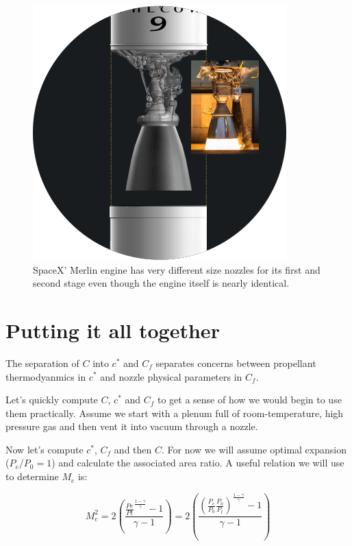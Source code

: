 \documentclass[twocolumn]{memoir} %
\begin{document}
\begin{figure}[H]
    \includegraphics[width=0.9\columnwidth]{merlin}
    \caption{SpaceX' Merlin engine has very different size nozzles for its first
    and second stage even though the engine itself is nearly identical.}
\end{figure}

\section{Putting it all together}\label{putting-it-all-together}

The separation of \(C\) into \(c^*\) and \(C_f\) separates
concerns between propellant thermodyanmics in \(c^*\) and nozzle
physical parameters in \(C_f\).

Let's quickly compute \(C\), \(c^*\) and \(C_f\) to get a sense of
how we would begin to use them practically. Assume we start with a
plenum full of room-temperature, high pressure gas and then vent it
into vacuum through a nozzle. 

Now let's compute \(c^*\), \(C_f\) and then \(C\). For now we will
assume optimal expansion ($P_e/P_0 = 1$) and calculate the associated area ratio. A
useful relation we will use to determine \(M_e\) is:

\begin{equation}
    M_e^2 = 2\left(\frac{\frac{Pe}{Pt}^{\frac{1-\gamma}{\gamma}}-1}{\gamma-1}\right) = 2\left(\frac{\left(\frac{P_e}{P_0}\frac{P_0}{P_t}\right)^{\frac{1-\gamma}{\gamma}}-1}{\gamma-1}\right)
\end{equation}
\end{document}

